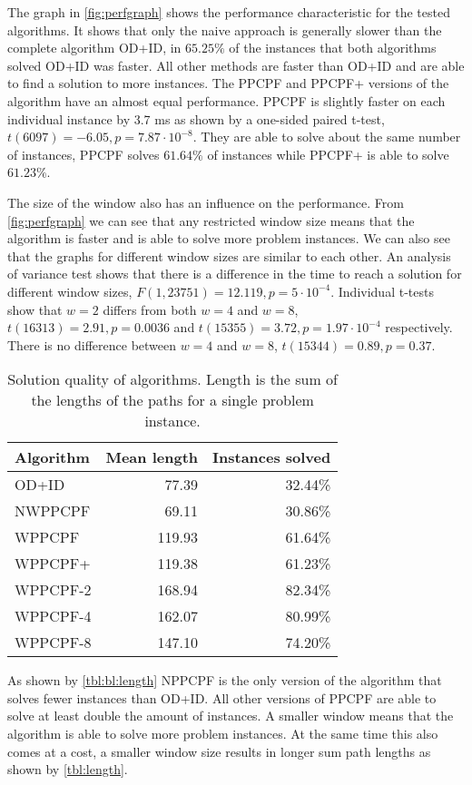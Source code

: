 The graph in \autoref{fig:perfgraph} shows the performance characteristic for
the tested algorithms. It shows that only the naive approach is generally
slower than the complete algorithm OD+ID, in $65.25\%$ of the instances that
both algorithms solved OD+ID was faster. All other methods are faster than
OD+ID and are able to find a solution to more instances. The PPCPF and PPCPF+
versions of the algorithm have an almost equal performance. PPCPF is
slightly faster on each individual instance by 3.7 ms as shown by a one-sided
paired t-test, $t(6097) = -6.05, p=7.87 \cdot 10^{-8}$. They are able to solve
about the same number of instances, PPCPF solves $61.64\%$ of
instances while PPCPF+ is able to solve $61.23\%$.

The size of the window also has an influence on the performance. From
\autoref{fig:perfgraph} we can see that any restricted window size means that
the algorithm is faster and is able to solve more problem instances. We can
also see that the graphs for different window sizes are similar to each other.
An analysis of variance test shows that there is a difference in the time to
reach a solution for different window sizes, $F(1, 23751) = 12.119, p=5\cdot
10^{-4}$. Individual t-tests show that $w=2$ differs from both $w=4$ and $w=8$,
$t(16313) = 2.91, p=0.0036$ and $t(15355)=3.72, p=1.97\cdot10^{-4}$
respectively. There is no difference between $w=4$ and $w=8$, $t(15344)=0.89,
p=0.37$.

\begin{table}[t]
	\centering
	\caption{Solution quality of algorithms. Length is the sum of the lengths
	of the paths for a single problem instance.}
	\label{tbl:length}
	\begin{tabular}{l|r|r}
		Algorithm & Mean length & Instances solved \\ \hline
		OD+ID & 77.39 & 32.44\% \\
		NWPPCPF & 69.11 & 30.86\% \\
		WPPCPF  & 119.93 & 61.64\% \\
		WPPCPF+ & 119.38 & 61.23\% \\
		WPPCPF-2 & 168.94 & 82.34\% \\
		WPPCPF-4 & 162.07 & 80.99\% \\
		WPPCPF-8 & 147.10 & 74.20\%
	\end{tabular}
\end{table}

As shown by \autoref{tbl:bl:length} NPPCPF is the only version of the algorithm
that solves fewer instances than OD+ID. All other versions of PPCPF are able to
solve at least double the amount of instances. A smaller window means that the
algorithm is able to solve more problem instances. At the same time this also
comes at a cost, a smaller window size results in longer sum path lengths as
shown by \autoref{tbl:length}.

%	

%	
